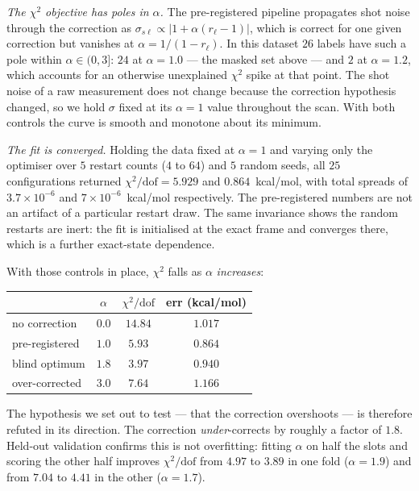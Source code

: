 \documentclass[aps,prx,twocolumn,superscriptaddress,nofootinbib,floatfix]{revtex4-2}
\begin{document}
\emph{The $\chi^2$ objective has poles in $\alpha$.} The pre-registered
pipeline propagates shot noise through the correction as
$\sigma_{s\ell}\propto|1+\alpha(r_\ell-1)|$, which is correct for one given
correction but vanishes at $\alpha = 1/(1-r_\ell)$. In this dataset $26$
labels have such a pole within $\alpha\in(0,3]$: $24$ at $\alpha=1.0$ --- the
masked set above --- and $2$ at $\alpha=1.2$, which accounts for an
otherwise unexplained $\chi^2$ spike at that point. The shot noise of a raw
measurement does not change because the correction hypothesis changed, so we
hold $\sigma$ fixed at its $\alpha=1$ value throughout the scan. With both
controls the curve is smooth and monotone about its minimum.

\emph{The fit is converged.} Holding the data fixed at $\alpha=1$ and
varying only the optimiser over $5$ restart counts ($4$ to $64$) and $5$
random seeds, all $25$ configurations returned
$\chi^2/\mathrm{dof}=5.929$ and $0.864$~kcal/mol, with total spreads of
$3.7\times10^{-6}$ and $7\times10^{-6}$~kcal/mol respectively. The pre-registered numbers are not an
artifact of a particular restart draw. The same invariance shows the
random restarts are inert: the fit is initialised at the exact frame and
converges there, which is a further exact-state dependence.

With those controls in place, $\chi^2$ falls as $\alpha$ \emph{increases}:

\begin{center}
\begin{tabular}{lccc}
\toprule
 & $\alpha$ & $\chi^2/\mathrm{dof}$ & err (kcal/mol) \\
\midrule
no correction      & $0.0$ & $14.84$ & $1.017$ \\
pre-registered     & $1.0$ & $5.93$  & $0.864$ \\
blind optimum      & $1.8$ & $3.97$  & $0.940$ \\
over-corrected     & $3.0$ & $7.64$  & $1.166$ \\
\bottomrule
\end{tabular}
\end{center}

The hypothesis we set out to test --- that the correction overshoots ---
is therefore refuted in its direction. The correction \emph{under}-corrects
by roughly a factor of $1.8$. Held-out validation confirms this is not
overfitting: fitting $\alpha$ on half the slots and scoring the other half
improves $\chi^2/\mathrm{dof}$ from $4.97$ to $3.89$ in one fold
($\alpha=1.9$) and from $7.04$ to $4.41$ in the other ($\alpha=1.7$).
\end{document}
